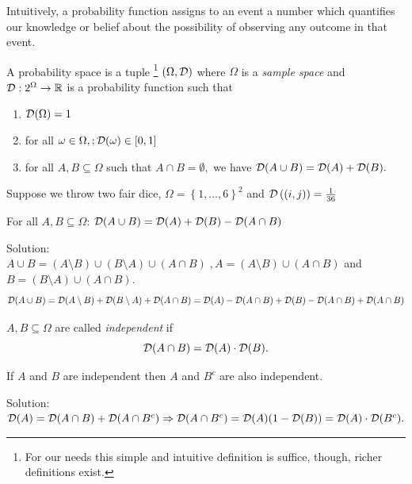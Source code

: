 \documentclass[11pt]{article}
\begin{document}
Intuitively, a probability function assigns to an event a number which quantifies our knowledge or belief about the possibility of observing any outcome in that event. 


\begin{definition}
A probability space is a tuple \footnote{For our needs this simple and intuitive definition is suffice, though, richer definitions exist.} $(\Omega, \mathcal{D})$ where $\Omega$ is a \emph{sample space} and $\mathcal{D}:2^{\Omega}\rightarrow\mathbb{R}$ is a probability function such that 
\begin{enumerate}
\item $\mathcal{D}(\Omega)=1$
\item for all $\omega\in\Omega,;\mathcal{D}(\omega)\in[0,1]$
\item for all $A,B\subseteq\Omega$ such that $A\cap B=\emptyset,$ we have $\mathcal{D}(A \cup B)=\mathcal{D}(A)+\mathcal{D}(B).$
\end{enumerate}
\end{definition} 
\begin{example}
Suppose we throw two fair dice, $\Omega=\left\{ 1,\dots,6\right\} ^{2}$ and $\mathcal{D}\left(\left(i,j\right)\right)=\frac{1}{36}$
\end{example}

\begin{exercise}
For all $A,B\subseteq\Omega$: $\mathcal{D}(A\cup B)=\mathcal{D}(A)+\mathcal{D}(B)-\mathcal{D}(A\cap B)$
\end{exercise}
Solution:\\
$A\cup B=(A\setminus B)\cup(B\setminus A)\cup(A\cap B)\; ,A=(A\setminus B)\cup(A\cap B)$ and $B=(B\setminus A)\cup(A\cap B).$
$$\mathcal{D}(A\cup B)=\mathcal{D}(A\setminus B)+\mathcal{D}(B\setminus A)+\mathcal{D}(A\cap B)=\mathcal{D}(A)-\mathcal{D}(A\cap B)+\mathcal{D}(B)-\mathcal{D}(A\cap B)+\mathcal{D}(A\cap B)$$ 

\begin{definition}
$A,B\subseteq\Omega$ are called \emph{independent} if $$\mathcal{D}(A\cap B) =\mathcal{D}(A)\cdot\mathcal{D}(B).$$
\end{definition}

\begin{exercise}
If $A$ and $B$ are independent then $A$ and $B^c$ are also independent. 
\end{exercise}
Solution: $\mathcal{D}(A)=\mathcal{D}(A\cap B)+\mathcal{D}(A\cap B^c)\Rightarrow\mathcal{D}(A\cap B^c)=\mathcal{D}(A)(1-\mathcal{D}(B))=\mathcal{D}(A)\cdot\mathcal{D}(B^c).$\\
\end{document}
